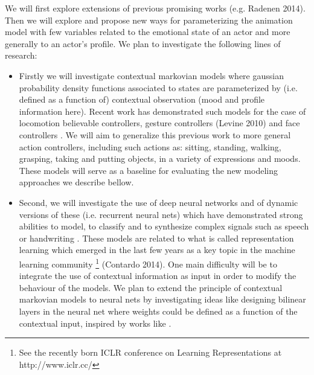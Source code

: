 
We will first explore extensions of previous promising works (e.g. Radenen 2014). Then we will explore and propose new ways for parameterizing the animation model with few variables related to the emotional state of an actor and more generally to an actor's profile. We plan to investigate the following lines of research:
 
\begin{itemize}  
  \item Firstly we will investigate contextual markovian models where gaussian probability density functions associated to states are parameterized by (i.e. defined as a function of) contextual observation (mood and profile information here). Recent work has demonstrated such models for the case of locomotion believable controllers, gesture controllers (Levine 2010) and face controllers \cite{Radenen2014, Ding2013, Ding2014}. We will aim to generalize this previous work to more general action controllers, including such actions as: sitting, standing, walking, grasping, taking and putting objects, in a variety of expressions and moods. These models will serve as a baseline for evaluating the new modeling approaches we describe bellow. 
  \item Second, we will investigate the use of deep neural networks and of dynamic versions of these (i.e. recurrent neural nets) which have demonstrated strong abilities to model, to classify and to synthesize complex signals such as speech or handwriting \cite{HintonDeepSpeech, Deng_Speech_Reco, DBLP:conf/nips/GravesS08, DBLP:journals/corr/Graves13}. 
  These models are related to what is called representation learning which emerged in the last few years as a key topic in the machine learning community \footnote{See the recently born ICLR conference on Learning Representations at http://www.iclr.cc/} (Contardo 2014). 
  One main difficulty will be to integrate the use of contextual information as input in order to modify the behaviour of the models. We plan to extend the principle of contextual markovian models to neural nets by investigating ideas like designing bilinear layers in the neural net where weights could be defined as a function of the contextual input, inspired by works like \cite{DBLP:conf/mm/ZhongLL11, DBLP:journals/pami/HutchinsonDY13}.

\end{itemize}
